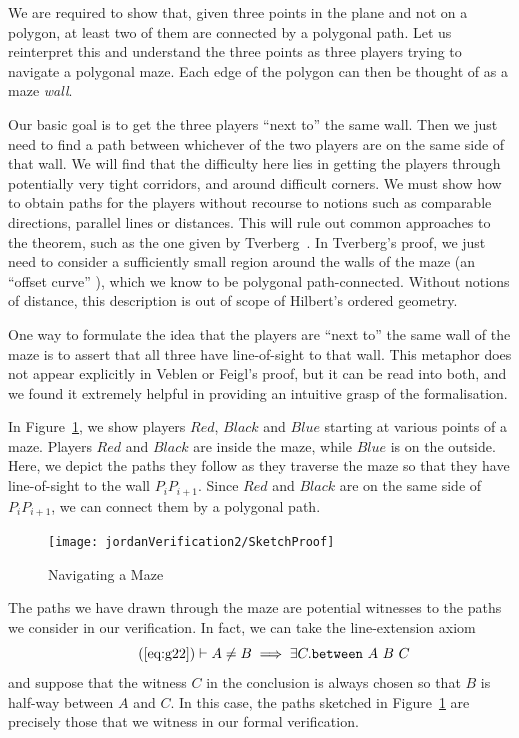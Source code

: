 We are required to show that, given three points in the plane and not on a polygon, at least two of them are connected by a polygonal path. Let us reinterpret this and understand the three points as three players trying to navigate a polygonal maze. Each edge of the polygon can then be thought of as a maze \emph{wall}.

Our basic goal is to get the three players ``next to'' the same wall. Then we just need to find a path between whichever of the two players are on the same side of that wall. We will find that the difficulty here lies in getting the players through potentially very tight corridors, and around difficult corners. We must show how to obtain paths for the players without recourse to notions such as comparable directions, parallel lines or distances. This will rule out common approaches to the theorem, such as the one given by Tverberg~\cite{TverbergJordan}. In Tverberg's proof, we just need to consider a sufficiently small region around the walls of the maze (an ``offset curve'' ), which we know to be polygonal path-connected. Without notions of distance, this description is out of scope of Hilbert's ordered geometry.

One way to formulate the idea that the players are ``next to'' the same wall of the maze is to assert that all three have line-of-sight to that wall. This metaphor does not appear explicitly in Veblen or Feigl's proof, but it can be read into both, and we found it extremely helpful in providing an intuitive grasp of the formalisation.

In Figure~\ref{fig:SketchProofJordan2}, we show players $Red$, $Black$ and $Blue$ starting at various points of a maze. Players $Red$ and $Black$ are inside the maze, while $Blue$ is on the outside. Here, we depict the paths they follow as they traverse the maze so that they have line-of-sight to the wall $P_iP_{i+1}$. Since $Red$ and $Black$ are on the same side of $P_iP_{i+1}$, we can connect them by a polygonal path.

\begin{figure}
  \centering\texttt{[image: jordanVerification2/SketchProof]}
  \caption{Navigating a Maze}
  \label{fig:SketchProofJordan2}
\end{figure}

The paths we have drawn through the maze are potential witnesses to the paths we consider in our verification. In fact, we can take the line-extension axiom 
\begin{equation}
  \tag{\ref{eq:g22}}
  \vdash A \neq B \implies \exists C. \between{A}{B}{C}
\end{equation}
and suppose that the witness $C$ in the conclusion is always chosen so that $B$ is half-way between $A$ and $C$. In this case, the paths sketched in Figure~\ref{fig:SketchProofJordan2} are precisely those that we witness in our formal verification.

